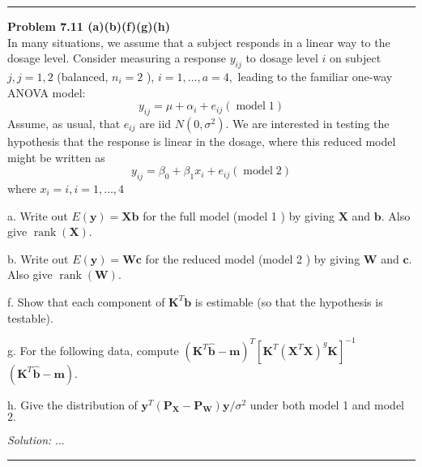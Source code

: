 \documentclass[a4paper, 11pt]{article}
\newenvironment{problem}[2][Problem]
    { \begin{mdframed}[backgroundcolor=gray!20] \textbf{#1 #2} \\}
    {  \end{mdframed}}
\newenvironment{solution}
    {\textit{Solution:}}
    {}
\begin{document}
\noindent\rule{7in}{2.8pt}

\begin{problem}{7.11 (a)(b)(f)(g)(h)}
In many situations, we assume that a subject responds in a linear way to the dosage level. Consider measuring a response $y_{i j}$ to dosage level $i$ on subject $j, j=1,2$ (balanced, $n_{i}=2$ ), $i=1, \ldots, a=4,$ leading to the familiar one-way ANOVA model:
$$
y_{i j}=\mu+\alpha_{i}+e_{i j}(\operatorname{model} 1)
$$
Assume, as usual, that $e_{i j}$ are iid $N\left(0, \sigma^{2}\right) .$ We are interested in testing the hypothesis that the response is linear in the dosage, where this reduced model might be written as
$$
y_{i j}=\beta_{0}+\beta_{1} x_{i}+e_{i j}(\operatorname{model} 2)
$$
where $x_{i}=i, i=1, \ldots, 4$

a. Write out $E(\mathbf{y})=\mathbf{X} \mathbf{b}$ for the full model (model 1 ) by giving $\mathbf{X}$ and $\mathbf{b}$. Also give $\operatorname{rank}(\mathbf{X})$.

b. Write out $E(\mathbf{y})=\mathbf{W} \mathbf{c}$ for the reduced model (model 2 ) by giving $\mathbf{W}$ and
$\mathbf{c}$. Also give $\operatorname{rank}(\mathbf{W})$.

f. Show that each component of $\mathbf{K}^{T} \mathbf{b}$ is estimable (so that the hypothesis is testable).

g. For the following data, compute $\left(\mathbf{K}^{T} \hat{\mathbf{b}}-\mathbf{m}\right)^{T}\left[\mathbf{K}^{T}\left(\mathbf{X}^{T} \mathbf{X}\right)^{g} \mathbf{K}\right]^{-1}$
$\left(\mathbf{K}^{T} \hat{\mathbf{b}}-\mathbf{m}\right)$.

h. Give the distribution of $\mathbf{y}^{T}\left(\mathbf{P}_{\mathbf{X}}-\mathbf{P}_{\mathbf{W}}\right) \mathbf{y} / \sigma^{2}$ under both model 1 and model $2 .$

\end{problem}
\begin{solution}
	...
\end{solution} 



\noindent\rule{7in}{2.8pt}
\end{document}
